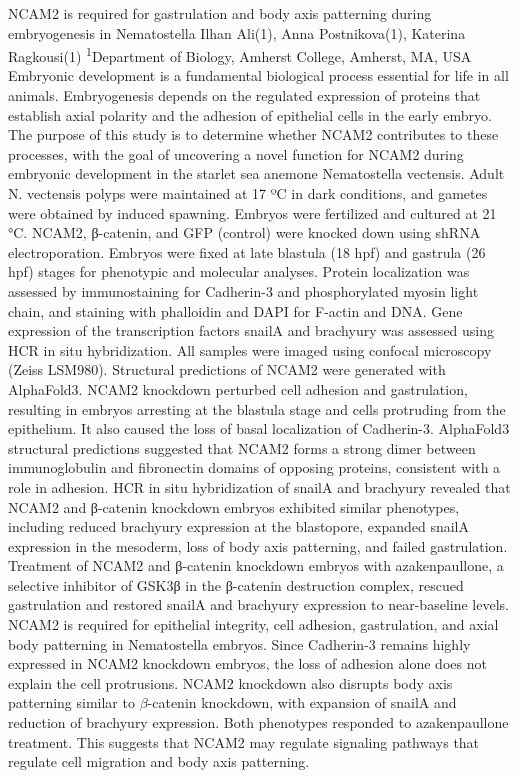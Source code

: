 \makeabstract
{
NCAM2 is required for gastrulation and body axis patterning during embryogenesis in Nematostella
}
{
Ilhan Ali(1), Anna Postnikova(1), Katerina Ragkousi(1)
}
{
\textsuperscript{1}Department of Biology, Amherst College, Amherst, MA, USA
}
{
Embryonic development is a fundamental biological process essential for life in all animals. Embryogenesis depends on the regulated expression of proteins that establish axial polarity and the adhesion of epithelial cells in the early embryo. The purpose of this study is to determine whether NCAM2 contributes to these processes, with the goal of uncovering a novel function for NCAM2 during embryonic development in the starlet sea anemone Nematostella vectensis.
}
{
Adult N. vectensis polyps were maintained at 17 ºC in dark conditions, and gametes were obtained by induced spawning. Embryos were fertilized and cultured at 21 °C. NCAM2, β-catenin, and GFP (control) were knocked down using shRNA electroporation. Embryos were fixed at late blastula (18 hpf) and gastrula (26 hpf) stages for phenotypic and molecular analyses. Protein localization was assessed by immunostaining for Cadherin-3 and phosphorylated myosin light chain, and staining with phalloidin and DAPI for F-actin and DNA. Gene expression of the transcription factors snailA and brachyury was assessed using HCR in situ hybridization. All samples were imaged using confocal microscopy (Zeiss LSM980). Structural predictions of NCAM2 were generated with AlphaFold3.
}
{
NCAM2 knockdown perturbed cell adhesion and gastrulation, resulting in embryos arresting at the blastula stage and cells protruding from the epithelium. It also caused the loss of basal localization of Cadherin-3. AlphaFold3 structural predictions suggested that NCAM2 forms a strong dimer between immunoglobulin and fibronectin domains of opposing proteins, consistent with a role in adhesion. HCR in situ hybridization of snailA and brachyury revealed that NCAM2 and β-catenin knockdown embryos exhibited similar phenotypes, including reduced brachyury expression at the blastopore, expanded snailA expression in the mesoderm, loss of body axis patterning, and failed gastrulation. Treatment of NCAM2 and β-catenin knockdown embryos with azakenpaullone, a selective inhibitor of GSK3β in the β-catenin destruction complex, rescued gastrulation and restored snailA and brachyury expression to near-baseline levels.
}
{
NCAM2 is required for epithelial integrity, cell adhesion, gastrulation, and axial body patterning in Nematostella embryos. Since Cadherin-3 remains highly expressed in NCAM2 knockdown embryos, the loss of adhesion alone does not explain the cell protrusions. NCAM2 knockdown also disrupts body axis patterning similar to $\beta$-catenin knockdown, with expansion of snailA and reduction of brachyury expression. Both phenotypes responded to azakenpaullone treatment. This suggests that NCAM2 may regulate signaling pathways that regulate cell migration and body axis patterning.
}

\newpage
